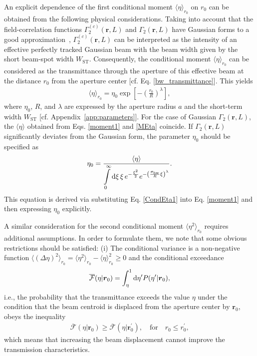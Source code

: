 \documentclass[aps,pra,twocolumn,a4paper,nofootinbib,preprintnumbers] {revtex4-1}
\newcommand{\D}{{\rm{d}}}
\begin{document}
	An explicit dependence of the first conditional moment $\langle\eta\rangle_{r_0}$ on $r_0$ can be obtained from the following physical considerations.
	Taking into account that the field-correlation functions   $\Gamma_{2}^{(c)}(\boldsymbol{r},L)$ and  $\Gamma_{2}(\boldsymbol{r},L)$ have Gaussian forms  to a good approximation~\cite{Brown, Yura1972},  $\Gamma_{2}^{(c)}(\boldsymbol{r},L)$ can be interpreted as the intensity of an effective perfectly tracked Gaussian beam %
	with the beam width given by the short beam-spot width $W_\mathrm{ST}$.
	Consequently, the conditional moment $\langle\eta\rangle_{r_0}$ can be considered as the transmittance through the aperture of this effective beam at the distance $r_0$ from the aperture center [cf. Eq. \eqref{bw_transmittance}].
	This yields
		\begin{align}\label{CondEta1}
		\langle\eta\rangle_{r_0}=\eta_0\exp\left[-\left(\frac{r_0}{R}\right)^{\lambda}\right],
		\end{align}
	where $\eta_0$, $R$, and $\lambda$ are expressed by the aperture radius $a$ and the short-term width $W_{\mathrm{ST}}$  [cf. Appendix~\ref{app:parameters}].
	For the case of Gaussian $\Gamma_{2}(\boldsymbol{r},L)$, the $\langle\eta\rangle$ obtained from Eqs. \eqref{moment1} and \eqref{MEta} coincide.
	If $\Gamma_{2}(\boldsymbol{r},L)$ significantly deviates from the Gaussian form, the parameter $\eta_0$ should be specified as
		\begin{align}\label{Eta1Defin}
		\eta_0=\frac{\langle\eta\rangle}{\displaystyle{\int\limits_{0}^\infty  \D\xi\,\xi \,e^{-\frac{\xi^2}{2}}e^{-\left(\frac{\sigma_{\mathrm{bw}}}{R}\xi\right)^{\lambda}}}}.
		\end{align}
	This equation is derived via substituting Eq. \eqref{CondEta1} into Eq. \eqref{moment1} and then expressing $\eta_0$ explicitly.
		
	A similar consideration for the second conditional moment $\langle\eta^2\rangle_{r_0}$ requires additional assumptions.
	In order to formulate them, we note that some obvious restrictions should be satisfied:
        (i) The conditional variance is a non-negative function  $\langle(\Delta\eta)^2\rangle_{r_0}=\langle\eta^2\rangle_{r_0}-\langle\eta\rangle_{r_0}^2{\ge}0$ and
	the  conditional  exceedance
		\begin{align}
		\overline{\mathcal{F}}(\eta|\boldsymbol{r}_0)=\int_\eta^1\D\eta^\prime P(\eta^\prime|\boldsymbol{r}_0),
		\end{align}
	i.e., the  probability that the transmittance exceeds the value $\eta$ under the condition that the beam centroid is displaced from the aperture center by $\boldsymbol{r}_0$, obeys the inequality
		\begin{align}\label{ExceedInequality}
		\overline{\mathcal{F}}(\eta|\boldsymbol{r}_0)\ge \overline{\mathcal{F}}(\eta|\boldsymbol{r}_0^\prime),\quad\text{for}\quad {r}_0\le {r}_0^\prime,
		\end{align}
	which  means that increasing the beam displacement cannot improve the transmission characteristics.
	
\end{document}
